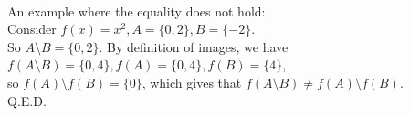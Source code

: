 \documentclass{article}
\begin{document}
\\[.15cm]
\indent An example where the equality does not hold:\\[.1cm]
\indent\indent Consider $f(x) = x^2, A = \{0, 2\}, B = \{-2\}$.\\[.1cm]
\indent\indent So $A\setminus B = \{0, 2\}$. By definition of images, we have $f(A\setminus B) = \{0, 4\}, f(A) = \{0, 4\}, f(B) = \{4\}$,\\
\indent\indent so $f(A)\setminus f(B) = \{0\}$, which gives that $f(A\setminus B)\ne f(A)\setminus f(B)$.\\[.15cm]
\indent Q.E.D.
\end{document}
